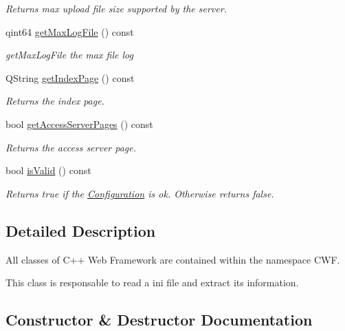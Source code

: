\begin{DoxyCompactItemize}
\begin{DoxyCompactList}\small\item\em Returns max upload file size supported by the server. \end{DoxyCompactList}\item 
qint64 \hyperlink{class_configuration_a1b8f3f5dbc7fe7ff0b2ae20bf18e711b}{get\+Max\+Log\+File} () const
\begin{DoxyCompactList}\small\item\em get\+Max\+Log\+File the max file log \end{DoxyCompactList}\item 
Q\+String \hyperlink{class_configuration_a2d039a90ec3caaace268f9f101bb1d87}{get\+Index\+Page} () const
\begin{DoxyCompactList}\small\item\em Returns the index page. \end{DoxyCompactList}\item 
bool \hyperlink{class_configuration_ad1598252b5ada32f60a243b360ee1675}{get\+Access\+Server\+Pages} () const
\begin{DoxyCompactList}\small\item\em Returns the access server page. \end{DoxyCompactList}\item 
bool \hyperlink{class_configuration_add18df7f4c8d8ee3f5ba9cf4b164345d}{is\+Valid} () const
\begin{DoxyCompactList}\small\item\em Returns true if the \hyperlink{class_configuration}{Configuration} is ok. Otherwise returns false. \end{DoxyCompactList}\end{DoxyCompactItemize}


\subsection{Detailed Description}
All classes of C++ Web Framework are contained within the namespace C\+WF. 

This class is responsable to read a ini file and extract its information. 

\subsection{Constructor \& Destructor Documentation}
\mbox{\label{class_configuration_a60b4858740fb32114fa5f4e72577fa7a}} 
